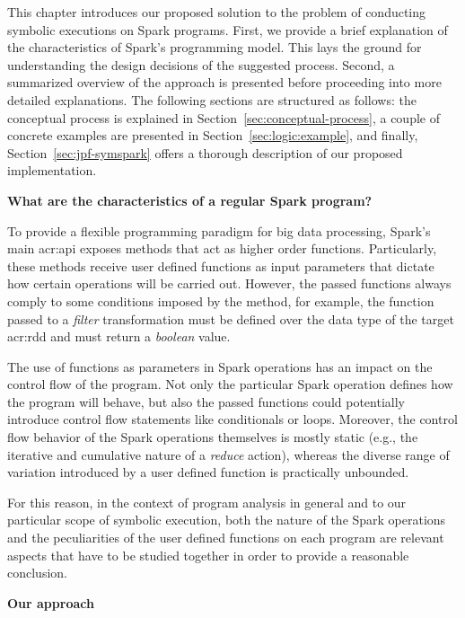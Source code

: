 \label{ch:symbolic-spark}

This chapter introduces our proposed solution to the problem of conducting symbolic executions on Spark programs. First, we provide a brief explanation of the characteristics of Spark's programming model. This lays the ground for understanding the design decisions of the suggested process. Second, a summarized overview of the approach is presented before proceeding into more detailed explanations. The following sections are structured as follows: the conceptual process is explained in Section~\ref{sec:conceptual-process}, a couple of concrete examples are presented in Section~\ref{sec:logic:example}, and finally, Section~\ref{sec:jpf-symspark} offers a thorough description of our proposed implementation.

\textbf{What are the characteristics of a regular Spark program?}

To provide a flexible programming paradigm for big data processing, Spark's main \acrshort{acr:api} exposes methods that act as higher order functions. Particularly, these methods receive user defined functions as input parameters that dictate how certain operations will be carried out. However, the passed functions always comply to some conditions imposed by the method, for example, the function passed to a \textit{filter} transformation must be defined over the data type of the target \acrshort{acr:rdd} and must return a \textit{boolean} value.

The use of functions as parameters in Spark operations has an impact on the control flow of the program. Not only the particular Spark operation defines how the program will behave, but also the passed functions could potentially introduce control flow statements like conditionals or loops. Moreover, the control flow behavior of the Spark operations themselves is mostly static (e.g., the iterative and cumulative nature of a \textit{reduce} action), whereas the diverse range of variation introduced by a user defined function is practically unbounded.

For this reason, in the context of program analysis in general and to our particular scope of symbolic execution, both the nature of the Spark operations and the peculiarities of the user defined functions on each program are relevant aspects that have to be studied together in order to provide a reasonable conclusion.

\textbf{Our approach}

